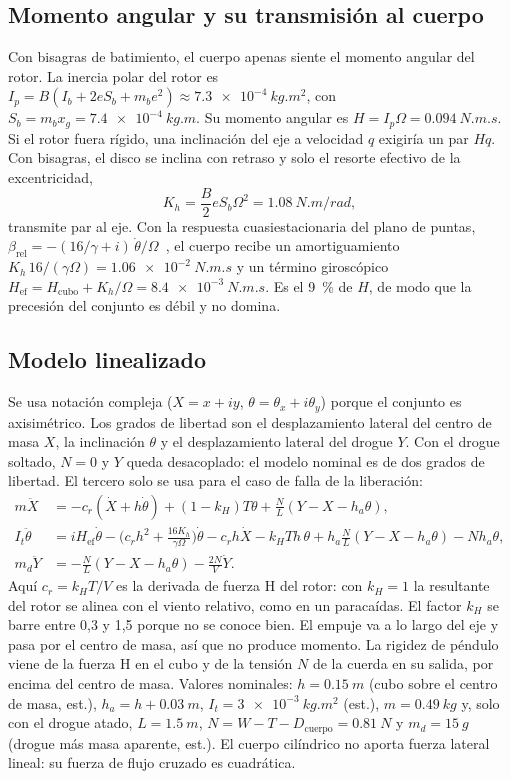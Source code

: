 \subsection{Momento angular y su transmisión al cuerpo}
Con bisagras de batimiento, el cuerpo apenas siente el momento angular del rotor. La
inercia polar del rotor es
$I_p=B(I_b+2eS_b+m_be^2)\approx\SI{7.3e-4}{kg.m^2}$, con $S_b=m_bx_g=\SI{7.4e-4}{kg.m}$.
Su momento angular es $H=I_p\Omega=\SI{0.094}{N.m.s}$. Si el rotor fuera rígido, una
inclinación del eje a velocidad $q$ exigiría un par $Hq$. Con bisagras, el disco se
inclina con retraso y solo el resorte efectivo de la excentricidad,
\begin{equation}
  K_h=\frac{B}{2}eS_b\Omega^2=\SI{1.08}{N.m/rad},
  \label{eq:estabilidad-Kh}
\end{equation}
transmite par al eje. Con la respuesta cuasiestacionaria del plano de puntas,
$\beta_\text{rel}=-(16/\gamma+i)\,\dot\theta/\Omega$~\cite{johnson1980}, el cuerpo recibe
un amortiguamiento $K_h\,16/(\gamma\Omega)=\SI{1.06e-2}{N.m.s}$ y un término
giroscópico $H_\text{ef}=H_\text{cubo}+K_h/\Omega=\SI{8.4e-3}{N.m.s}$. Es el
\SI{9}{\percent} de $H$, de modo que la precesión del conjunto es débil y no domina.

\subsection{Modelo linealizado}
Se usa notación compleja ($X=x+iy$, $\theta=\theta_x+i\theta_y$) porque el conjunto es
axisimétrico. Los grados de libertad son el desplazamiento lateral del centro de masa
$X$, la inclinación $\theta$ y el desplazamiento lateral del drogue $Y$. Con el drogue
soltado, $N=0$ y $Y$ queda desacoplado: el modelo nominal es de dos grados de libertad.
El tercero solo se usa para el caso de falla de la liberación:
\begin{align}
  m\ddot X &= -c_r(\dot X+h\dot\theta)+(1-k_H)T\theta+\frac{N}{L}(Y-X-h_a\theta),\\
  I_t\ddot\theta &= iH_\text{ef}\dot\theta-\Big(c_rh^2+\frac{16K_h}{\gamma\Omega}\Big)\dot\theta
   -c_rh\dot X-k_HTh\,\theta+h_a\frac{N}{L}(Y-X-h_a\theta)-Nh_a\theta,\\
  m_d\ddot Y &= -\frac{N}{L}(Y-X-h_a\theta)-\frac{2N}{V}\dot Y .
  \label{eq:estabilidad-modelo}
\end{align}
Aquí $c_r=k_HT/V$ es la derivada de fuerza H del rotor: con $k_H=1$ la resultante del
rotor se alinea con el viento relativo, como en un paracaídas. El factor $k_H$ se barre
entre 0,3 y 1,5 porque no se conoce bien. El empuje va a lo largo del eje y pasa por el
centro de masa, así que no produce momento. La rigidez de péndulo viene de la fuerza H en
el cubo y de la tensión $N$ de la cuerda en su salida, por encima del centro de masa.
Valores nominales: $h=\SI{0.15}{m}$ (cubo sobre el centro de masa, est.),
$h_a=h+\SI{0.03}{m}$, $I_t=\SI{3e-3}{kg.m^2}$ (est.), $m=\SI{0.49}{kg}$ y, solo con el drogue
atado, $L=\SI{1.5}{m}$, $N=W-T-D_\text{cuerpo}=\SI{0.81}{N}$ y $m_d=\SI{15}{g}$ (drogue más
masa aparente, est.). El cuerpo cilíndrico no aporta fuerza lateral lineal: su fuerza de flujo cruzado
es cuadrática.

